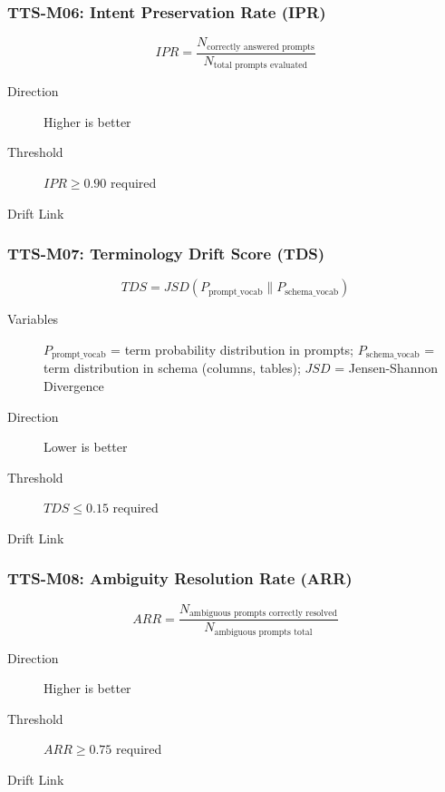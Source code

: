 \subsubsection{TTS-M06: Intent Preservation Rate (IPR)}

\begin{equation}
\boxed{
IPR = \frac{N_{\text{correctly answered prompts}}}{N_{\text{total prompts evaluated}}}
}
\end{equation}

\begin{description}
  \item[Direction] Higher is better
  \item[Threshold] $IPR \geq 0.90$ required
  \item[Drift Link] 
\end{description}

\subsubsection{TTS-M07: Terminology Drift Score (TDS)}

\begin{equation}
\boxed{
TDS = JSD(P_{\text{prompt\_vocab}} \| P_{\text{schema\_vocab}})
}
\end{equation}

\begin{description}
  \item[Variables] $P_{\text{prompt\_vocab}}$ = term probability distribution in prompts;
        $P_{\text{schema\_vocab}}$ = term distribution in schema (columns, tables);
        $JSD$ = Jensen-Shannon Divergence
  \item[Direction] Lower is better
  \item[Threshold] $TDS \leq 0.15$ required
  \item[Drift Link] 
\end{description}

\subsubsection{TTS-M08: Ambiguity Resolution Rate (ARR)}

\begin{equation}
\boxed{
ARR = \frac{N_{\text{ambiguous prompts correctly resolved}}}{N_{\text{ambiguous prompts total}}}
}
\end{equation}

\begin{description}
  \item[Direction] Higher is better
  \item[Threshold] $ARR \geq 0.75$ required
  \item[Drift Link] 
\end{description}


